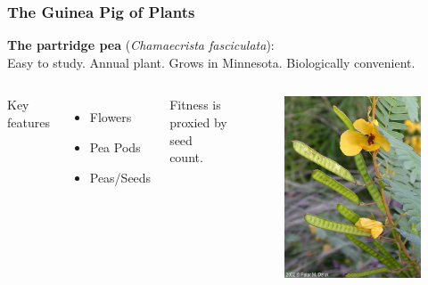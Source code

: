 \documentclass[table]{beamer}
\begin{document}
\begin{frame}
  \frametitle{The Guinea Pig of Plants}
  \textbf{The partridge pea} (\emph{Chamaecrista fasciculata}): \\
  Easy to study.  Annual plant.  Grows in Minnesota. Biologically convenient.
  
\begin{columns}[c] %
Key features
  \begin{itemize}
    \item Flowers
    \item Pea Pods
    \item Peas/Seeds
  \end{itemize}
Fitness is proxied by seed count.
  \begin{figure}
  \includegraphics[width=0.6\linewidth]{cf.jpg}
  \end{figure}
\end{columns}
\end{frame}
\end{document}
